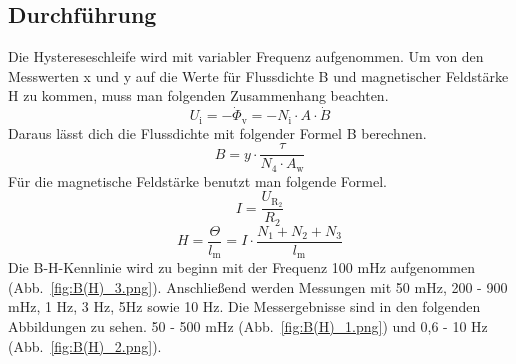 \documentclass[a4paper,twoside,12pt,DIV=13,BCOR=5mm,numbers=noenddot,cleardoublepage=empty]{scrbook}
\begin{document}
        \subsection{Durchf\"uhrung}
        Die Hystereseschleife wird mit variabler Frequenz aufgenommen. Um von 
        den Messwerten x und y auf die Werte f\"ur Flussdichte B und magnetischer 
        Feldst\"arke H zu kommen, muss man folgenden Zusammenhang beachten.
        \begin{equation}
            U_\mathrm{i} = - \dot{\Phi}_\mathrm{v} = - N_\mathrm{i} \cdot A \cdot \dot{B}
        \end{equation}
        Daraus l\"asst dich die Flussdichte mit folgender Formel B berechnen.
        \begin{equation}
            B = y \cdot \frac{\tau}{N_\mathrm{4} \cdot A_\mathrm{w}}
        \end{equation}
        F\"ur die magnetische Feldst\"arke benutzt man folgende Formel.
        \begin{equation}
            I = \frac{U_\mathrm{R_\mathrm{2}}}{R_\mathrm{2}}
        \end{equation}
        \begin{equation}
            H = \frac{\Theta}{l_\mathrm{m}} = I \cdot \frac{N_\mathrm{1} + N_\mathrm{2} + N_\mathrm{3}}{l_\mathrm{m}}
        \end{equation}
        Die B-H-Kennlinie wird zu beginn mit der Frequenz 100 mHz aufgenommen 
        (Abb.~\ref{fig:B(H)_3.png}). Anschlie\ss{}end werden Messungen mit 50 mHz, 200 - 900 mHz, 
        1 Hz, 3 Hz, 5Hz sowie 10 Hz. Die Messergebnisse sind in den folgenden 
        Abbildungen zu sehen. 50 - 500 mHz (Abb.~\ref{fig:B(H)_1.png}) und 0,6 - 10 Hz 
        (Abb.~\ref{fig:B(H)_2.png}).
        \pagebreak
\end{document}
